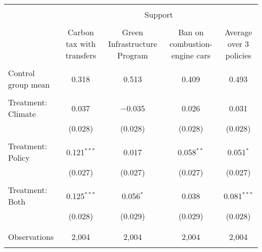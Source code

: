 
\begin{tabular}{@{\extracolsep{5pt}}lcccc} 
\\[-1.8ex]\hline 
\hline \\[-1.8ex] 
 & \multicolumn{4}{c}{Support} \\ 
\cline{2-5} 
\\[-1.8ex] & Carbon tax with transfers & Green Infrastructure Program & Ban on combustion-engine cars & Average over 3 policies \\ 
\hline \\[-1.8ex] 
 Control group mean & 0.318 & 0.513 & 0.409 & 0.493  \\ \hline \\[-1.8ex] Treatment: Climate & 0.037 & $-$0.035 & 0.026 & 0.031 \\ 
  & (0.028) & (0.028) & (0.028) & (0.028) \\ 
  & & & & \\ 
 Treatment: Policy & 0.121$^{***}$ & 0.017 & 0.058$^{**}$ & 0.051$^{*}$ \\ 
  & (0.027) & (0.027) & (0.027) & (0.027) \\ 
  & & & & \\ 
 Treatment: Both & 0.125$^{***}$ & 0.056$^{*}$ & 0.038 & 0.081$^{***}$ \\ 
  & (0.028) & (0.029) & (0.029) & (0.028) \\ 
  & & & & \\ 
\hline \\[-1.8ex] 

Observations & 2,004 & 2,004 & 2,004 & 2,004 \\ 
\hline 
\hline \\[-1.8ex] 
\end{tabular} 